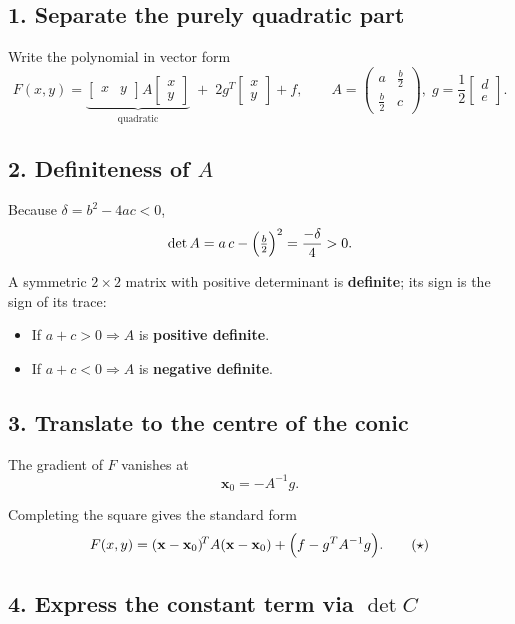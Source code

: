 
\subsection*{1. Separate the purely quadratic part}

Write the polynomial in vector form
\[
F(x,y)=\underbrace{\begin{bmatrix}x&y\end{bmatrix}
A\begin{bmatrix}x\\y\end{bmatrix}}_{\text{quadratic}}
\;+\;
2g^{\!T}\begin{bmatrix}x\\y\end{bmatrix}+f,
\qquad
A=\begin{pmatrix}a&\tfrac{b}{2}\\[2pt]\tfrac{b}{2}&c\end{pmatrix},\;
g=\frac{1}{2}\begin{bmatrix}d\\ e\end{bmatrix}.
\]

\subsection*{2. Definiteness of $A$}

Because $\delta=b^{2}-4ac<0$,
\[
\det A
=a\,c-\Bigl(\tfrac{b}{2}\Bigr)^{2}
=\frac{-\delta}{4}>0.
\]

A symmetric $2\times2$ matrix with positive determinant is \textbf{definite}; its sign is the sign of its trace:
\begin{itemize}
\item If $a+c>0 \Rightarrow A$ is \textbf{positive definite}.
\item If $a+c<0 \Rightarrow A$ is \textbf{negative definite}.
\end{itemize}

\subsection*{3. Translate to the centre of the conic}

The gradient of $F$ vanishes at
\[
\mathbf{x}_{0}=-A^{-1}g.
\]

Completing the square gives the standard form
\[
F(x,y)=
(\mathbf{x}-\mathbf{x}_{0})^{\!T}A(\mathbf{x}-\mathbf{x}_{0})
+\Bigl(f-g^{T}A^{-1}g\Bigr).
\tag{$\star$}
\]

\subsection*{4. Express the constant term via $\det C$}

